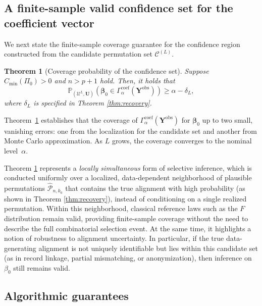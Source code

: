 \documentclass[11pt, reqno]{amsart}
\newcommand{\bP}{\mathbb{P}}
\renewcommand{\hat}{\widehat}
\renewcommand{\ge}{\geqslant}
\newcommand{\mP}{\mathcal{P}}
\newcommand{\1}{\mbox{1}\hspace{-0.25em}\mbox{l}}
\newcommand{\obs}{\mathrm{obs}}
\theoremstyle{definition}\newtheorem{problem}{Problem}[section]
\theoremstyle{definition}\newtheorem{definition}[problem]{Definition}
\theoremstyle{remark}\newtheorem{assumption}{Assumption}
\theoremstyle{remark}\newtheorem{remark}[problem]{Remark}
\theoremstyle{definition}\newtheorem{example}[problem]{Example}
\theoremstyle{plain}\newtheorem{theorem}[problem]{Theorem}
\theoremstyle{plain}\newtheorem{question}[problem]{Question}
\theoremstyle{plain}\newtheorem{lemma}[problem]{Lemma}
\theoremstyle{plain}\newtheorem{proposition}[problem]{Proposition}
\theoremstyle{plain}\newtheorem{corollary}[problem]{Corollary}
\theoremstyle{plain}\newtheorem{conjecture}[problem]{Conjecture}
\begin{document}
\subsection{A finite-sample valid confidence set for the coefficient vector}

We next state the finite-sample coverage guarantee for the confidence region
constructed from the candidate permutation set $\mathcal{C}^{(L)}$.

\begin{theorem}[Coverage probability of the confidence set]\label{thm:confidence}
Suppose $C_{\min}(\Pi_0) > 0$ and $n > p + 1$ hold. Then, it holds that
\begin{equation}
         \bP_{\left(\mathcal{U}^L, \bm{U}\right)} \left( \bm{\beta}_0 \in \Gamma_{\alpha}^{\mathrm{coef}}(\bm{Y}^{\obs}) \right) \ge \alpha - \delta_L,
\end{equation}
where $\delta_L$ is specified in Theorem \ref{thm:recovery}.
\end{theorem}

Theorem~\ref{thm:confidence} establishes that the coverage of $\Gamma_{\alpha}^{\mathrm{coef}}(\bm{Y}^{\obs})$ for $\bm{\beta}_0$ up to two small, vanishing errors: one from the localization for the candidate set and another from Monte Carlo approximation.  
As $L$ grows, the coverage converges to the nominal level~$\alpha$.  

Theorem \ref{thm:confidence} represents a \emph{locally simultaneous} form of selective inference, which is conducted uniformly over a localized, data-dependent neighborhood of plausible permutations $\hat{\mP}_{n,k_0}$ that contains the true alignment with high probability (as shown in Theorem \ref{thm:recovery}), instead of conditioning on a single realized permutation. Within this neighborhood, classical reference laws such as the $F$ distribution remain valid, providing finite-sample coverage without the need to describe the full combinatorial selection event. At the same time, it highlights a notion of robustness to alignment uncertainty. In particular, if the true data-generating alignment is not uniquely identifiable but lies within this candidate set (as in record linkage, partial mismatching, or anonymization), then inference on $\beta_0$ still remains valid.


\subsection{Algorithmic guarantees}
\end{document}
